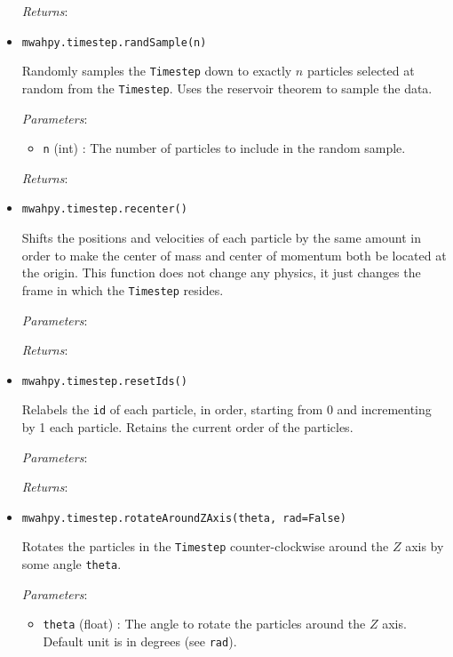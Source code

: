 \documentclass{article}
\begin{document}
\begin{itemize}
\begin{itemize}
\end{itemize}

\textit{Returns}: 



\item \verb!mwahpy.timestep.randSample(n)!

Randomly samples the \verb!Timestep! down to exactly $n$ particles selected at random from the \verb!Timestep!. Uses the reservoir theorem to sample the data.

\textit{Parameters}: \begin{itemize}

\item \verb!n! (int) : The number of particles to include in the random sample.

\end{itemize}

\textit{Returns}: 



\item \verb!mwahpy.timestep.recenter()!

Shifts the positions and velocities of each particle by the same amount in order to make the center of mass and center of momentum both be located at the origin. This function does not change any physics, it just changes the frame in which the \verb!Timestep! resides.

\textit{Parameters}: 

\textit{Returns}: 



\item \verb!mwahpy.timestep.resetIds()!

Relabels the \verb!id! of each particle, in order, starting from 0 and incrementing by 1 each particle. Retains the current order of the particles. 

\textit{Parameters}: 

\textit{Returns}: 



\item \verb!mwahpy.timestep.rotateAroundZAxis(theta, rad=False)!

Rotates the particles in the \verb!Timestep! counter-clockwise around the $Z$ axis by some angle \verb!theta!.

\textit{Parameters}: \begin{itemize}

\item \verb!theta! (float) : The angle to rotate the particles around the $Z$ axis. Default unit is in degrees (see \verb!rad!).


\end{itemize}
\end{itemize}
\end{document}
